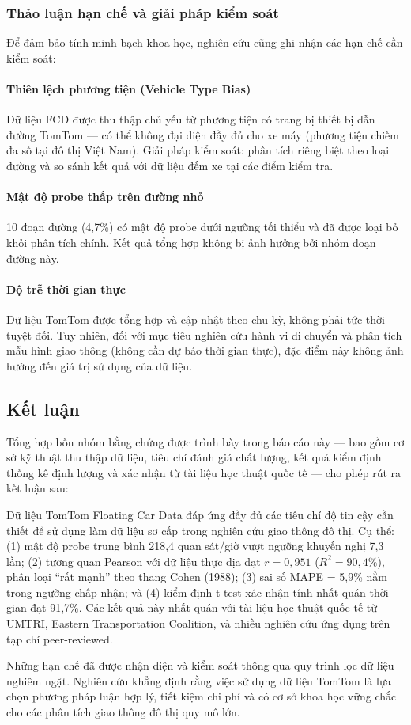 \subsubsection{Thảo luận hạn chế và giải pháp kiểm soát}
Để đảm bảo tính minh bạch khoa học, nghiên cứu cũng ghi nhận các hạn chế cần kiểm soát:

\paragraph{Thiên lệch phương tiện (Vehicle Type Bias)}
Dữ liệu FCD được thu thập chủ yếu từ phương tiện có trang bị thiết bị dẫn đường TomTom --- có thể không đại diện đầy đủ cho xe máy (phương tiện chiếm đa số tại đô thị Việt Nam). Giải pháp kiểm soát: phân tích riêng biệt theo loại đường và so sánh kết quả với dữ liệu đếm xe tại các điểm kiểm tra.

\paragraph{Mật độ probe thấp trên đường nhỏ}
10 đoạn đường (4,7\%) có mật độ probe dưới ngưỡng tối thiểu và đã được loại bỏ khỏi phân tích chính. Kết quả tổng hợp không bị ảnh hưởng bởi nhóm đoạn đường này.

\paragraph{Độ trễ thời gian thực}
Dữ liệu TomTom được tổng hợp và cập nhật theo chu kỳ, không phải tức thời tuyệt đối. Tuy nhiên, đối với mục tiêu nghiên cứu hành vi di chuyển và phân tích mẫu hình giao thông (không cần dự báo thời gian thực), đặc điểm này không ảnh hưởng đến giá trị sử dụng của dữ liệu.

\subsection{Kết luận}
Tổng hợp bốn nhóm bằng chứng được trình bày trong báo cáo này --- bao gồm cơ sở kỹ thuật thu thập dữ liệu, tiêu chí đánh giá chất lượng, kết quả kiểm định thống kê định lượng và xác nhận từ tài liệu học thuật quốc tế --- cho phép rút ra kết luận sau:

Dữ liệu TomTom Floating Car Data đáp ứng đầy đủ các tiêu chí độ tin cậy cần thiết để sử dụng làm dữ liệu sơ cấp trong nghiên cứu giao thông đô thị. Cụ thể: (1) mật độ probe trung bình 218,4 quan sát/giờ vượt ngưỡng khuyến nghị 7,3 lần; (2) tương quan Pearson với dữ liệu thực địa đạt $r = 0,951$ ($R^2 = 90,4\%$), phân loại ``rất mạnh'' theo thang Cohen (1988); (3) sai số MAPE = 5,9\% nằm trong ngưỡng chấp nhận; và (4) kiểm định t-test xác nhận tính nhất quán thời gian đạt 91,7\%. Các kết quả này nhất quán với tài liệu học thuật quốc tế từ UMTRI, Eastern Transportation Coalition, và nhiều nghiên cứu ứng dụng trên tạp chí peer-reviewed.

Những hạn chế đã được nhận diện và kiểm soát thông qua quy trình lọc dữ liệu nghiêm ngặt. Nghiên cứu khẳng định rằng việc sử dụng dữ liệu TomTom là lựa chọn phương pháp luận hợp lý, tiết kiệm chi phí và có cơ sở khoa học vững chắc cho các phân tích giao thông đô thị quy mô lớn.

